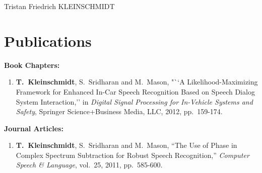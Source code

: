 \documentclass[margin,line]{resume}
\begin{document}
\begin{resume}




  \opening{Tristan Friedrich KLEINSCHMIDT}

\section{\sc Publications}
{
%
%
%
%
%
{\bf Book Chapters:}
\begin{enumerate}
\item{\bf T.~Kleinschmidt}, S.~Sridharan and M.~Mason, "``A Likelihood-Maximizing Framework for Enhanced In-Car Speech Recognition Based on Speech Dialog System Interaction,'' in \emph{Digital Signal Processing for In-Vehicle Systems and Safety}, Springer Science+Business Media, LLC, 2012, pp.~159-174.
\end{enumerate}

{\bf Journal Articles:}
\begin{enumerate}
	  \setlength{\itemsep}{2pt}
	  \setlength{\parsep}{0pt}
    \setlength{\parskip}{0pt}

\item {\bf T.~Kleinschmidt}, S.~Sridharan and M.~Mason, ``The Use of Phase in Complex Spectrum Subtraction for Robust Speech Recognition,'' \emph{Computer Speech \& Language}, vol.~25, 2011, pp.~585-600.
\end{enumerate}


}
\end{resume}
\end{document}
